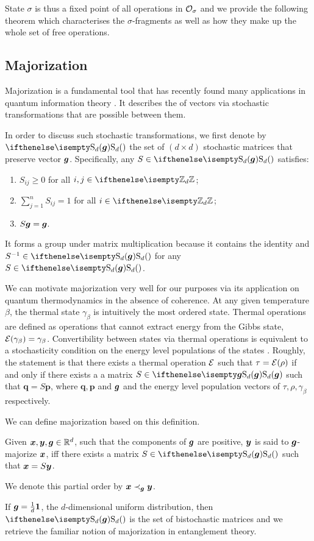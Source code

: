 State $\sigma$ is thus a fixed point of all operations in $\mathcal{O}_\sigma$ and we provide the following theorem which characterises the $\sigma$-fragments as well as how they make up the whole set of free operations. 

\subsection{Majorization}\label{sec:major}

Majorization is a fundamental tool that has recently found many applications in quantum information theory .
It describes the  of vectors via stochastic transformations that are possible between them.

In order to discuss such stochastic transformations, we first denote by $\stoch$ the set of $(d \times d)$ stochastic matrices that preserve vector $\bm{g}$.
Specifically, any $S \in \stoch$ satisfies:
\begin{enumerate}
    \item $S_{ij} \geq 0$ for all $i, j \in \zd$;
    \item $\sum\limits_{j=1}^n S_{ij} = 1$ for all $i \in \zd$;
    \item $S\bm{g} = \bm{g}$.
\end{enumerate}
It forms a group under matrix multiplication because it contains the identity and $S^{-1} \in \stoch$ for any $S \in \stoch$.

We can motivate majorization very well for our purposes via its application on quantum thermodynamics in the absence of coherence.
At any given temperature $\beta$, the thermal state $\gamma_\beta$ is intuitively the most ordered state. 
Thermal operations are defined as operations that cannot extract energy from the Gibbs state, $\mathcal{E}(\gamma_\beta) = \gamma_\beta$.
Convertibility between states via thermal operations is equivalent to a stochasticity condition on the energy level populations of the states .
Roughly, the statement is that there exists a thermal operation $\mathcal{E}$ such that $\tau = \mathcal{E}(\rho)$ if and only if there exists a a matrix $S \in \stoch[\bmg]$ such that $\bm{q} = S\bm{p}$, where $\bm{q}, \bm{p}$ and $\bm{g}$ and the energy level population vectors of $\tau, \rho, \gamma_\beta$ respectively. 

We can define majorization based on this definition.
\begin{definition}\label{def:dmajor}
    Given $\bm{x}, \bm{y}, \bm{g} \in \mathbb{R}^d$, such that the components of $\bm{g}$ are positive, $\bm{y}$ is said to $\bm{g}$-majorize $\bm{x}$, iff there exists a matrix $S \in \stoch$ such that $\bm{x} = S\bm{y}$.
    
    We denote this partial order by $\bm{x} \prec_{\bm{g}} \bm{y}$.
\end{definition}
If $\bm{g} = \frac{1}{d}\bm{1}$, the $d$-dimensional uniform distribution, then $\stoch$ is the set of bistochastic matrices and we retrieve the familiar notion of majorization in entanglement theory. 

